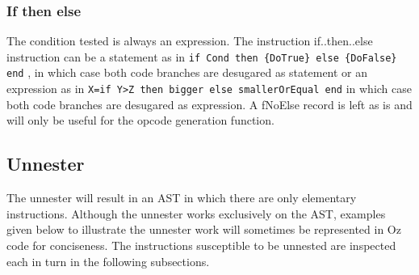 \documentclass[a4paper]{memoir}
\begin{document}
\subsubsection{If then else}
The condition tested is always an expression.
The instruction if..then..else instruction can be a statement as in 
\lstinline!if Cond then {DoTrue} else {DoFalse} end!
, in which case both code branches are desugared as statement
or an expression as in
\lstinline!X=if Y>Z then bigger else smallerOrEqual end!
in which case both code branches are desugared as expression.
A fNoElse record is left as is and will only be useful for the opcode generation function.

\subsection{Unnester}\label{sec:arch:unnester}
The unnester will result in an AST in which there are only elementary instructions. Although the unnester works exclusively on the AST, examples given below to illustrate the unnester work will sometimes be represented in Oz code for conciseness.  The instructions susceptible to be unnested are inspected each in turn in the following subsections.
\end{document}

